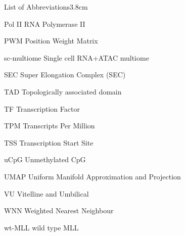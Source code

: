 \begin{mclistof}{List of Abbreviations}{3.8cm}
\item[Pol II] RNA Polymerase II

\item[PWM] Position Weight Matrix

\item[sc-multiome] Single cell RNA+ATAC multiome

\item[SEC] Super Elongation Complex (SEC)

\item[TAD] Topologically associated domain

\item[TF] Transcription Factor

\item[TPM] Transcripts Per Million

\item[TSS] Transcription Start Site

\item[uCpG] Unmethylated CpG

\item[UMAP] Uniform Manifold Approximation and Projection

\item[VU] Vitelline and Umbilical

\item[WNN] Weighted Nearest Neighbour

\item[wt-MLL] wild type MLL


\end{mclistof} 


